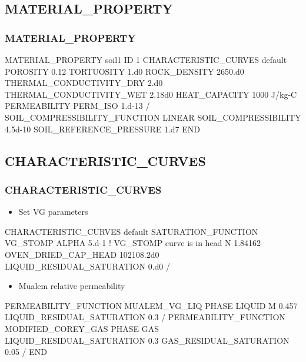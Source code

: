 \documentclass{beamer}
\newcommand\bluecomment[1]{{{\color{blue} #1}}}
\begin{document}
\subsection{MATERIAL\_PROPERTY}

\begin{frame}\frametitle{MATERIAL\_PROPERTY}

\begin{semiverbatim}
MATERIAL_PROPERTY soil1
  ID 1
  CHARACTERISTIC_CURVES default
  POROSITY 0.12
  TORTUOSITY 1.d0
  ROCK_DENSITY 2650.d0
  THERMAL_CONDUCTIVITY_DRY 2.d0
  THERMAL_CONDUCTIVITY_WET 2.18d0
  HEAT_CAPACITY 1000 J/kg-C
  PERMEABILITY
    PERM_ISO 1.d-13
  /
  SOIL_COMPRESSIBILITY_FUNCTION LINEAR
  SOIL_COMPRESSIBILITY 4.5d-10
  SOIL_REFERENCE_PRESSURE 1.d7
END
\end{semiverbatim}

\end{frame}

\subsection{CHARACTERISTIC\_CURVES}

\begin{frame}\frametitle{CHARACTERISTIC\_CURVES}

\begin{itemize}
\item Set VG parameters
\end{itemize}

\begin{semiverbatim}
CHARACTERISTIC_CURVES default
  SATURATION_FUNCTION VG_STOMP
    ALPHA 5.d-1 \bluecomment{! VG_STOMP curve is in head}
    N 1.84162
    OVEN_DRIED_CAP_HEAD 102108.2d0
    LIQUID_RESIDUAL_SATURATION 0.d0
  /
\end{semiverbatim}

\newpage
\begin{itemize}
\item Mualem relative permeability
\end{itemize}

\begin{semiverbatim}
  PERMEABILITY_FUNCTION MUALEM_VG_LIQ
    PHASE LIQUID
    M 0.457
    LIQUID_RESIDUAL_SATURATION 0.3
  /
  PERMEABILITY_FUNCTION MODIFIED_COREY_GAS
    PHASE GAS
    LIQUID_RESIDUAL_SATURATION 0.3
    GAS_RESIDUAL_SATURATION 0.05
  /
END
\end{semiverbatim}

\end{frame}
\end{document}
